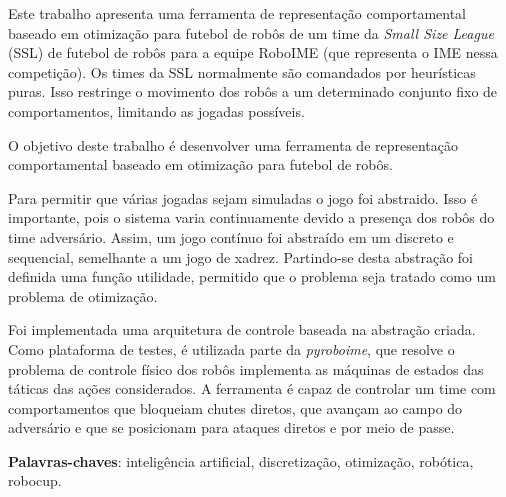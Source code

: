\setlength{\absparsep}{18pt} %
\begin{resumo}

  Este trabalho apresenta uma ferramenta de representação comportamental baseado
  em otimização para futebol de robôs de um time da \textit{Small
  Size League} (SSL) de futebol de robôs para a equipe RoboIME (que representa o
  IME nessa competição). Os times da SSL normalmente são comandados por
  heurísticas puras. Isso restringe o movimento dos robôs a um determinado
  conjunto fixo de comportamentos, limitando as jogadas possíveis.

  O objetivo deste trabalho é desenvolver uma ferramenta de representação
  comportamental baseado em otimização para futebol de robôs.

  Para permitir que várias jogadas sejam simuladas o jogo foi abstraido. Isso é
  importante, pois o sistema varia continuamente devido a presença dos robôs do
  time adversário. Assim, um jogo contínuo foi abstraído em um discreto e sequencial,
  semelhante a um jogo de xadrez. Partindo-se desta abstração foi definida
  uma função utilidade, permitido que o problema seja tratado como um problema
  de otimização.

  Foi implementada uma arquitetura de controle baseada na abstração criada.
  Como plataforma de testes, é utilizada parte da \textit{pyroboime}, que
  resolve o problema de controle físico dos robôs implementa as máquinas de estados
  das táticas das ações considerados. A ferramenta é capaz de controlar um time com
  comportamentos que bloqueiam chutes diretos, que avançam ao campo do adversário e
  que se posicionam para ataques diretos e por meio de passe.

  \textbf{Palavras-chaves}: inteligência artificial, discretização, otimização, robótica, robocup.
\end{resumo}

